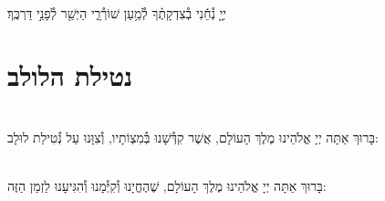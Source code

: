 \documentclass[twoside, openany, parskip=half, 11pt]{book}
\begin{document}
\vspace{-.5\baselineskip}

\\
 יְיָ֤ נְ֯חֵ֬נִי בְ֯צִדְקָתֶ֗ךָ לְ֯מַ֥עַן שׁוֹרְ֯רָ֑י הַיְשַׁ֖ר לְ֯פָנַ֣י דַּרְכֶּֽךָ׃

\vfill

\quad{}\quad{}






\section[נטילת הלולב]{ נטילת הלולב }
\label{lulav}
\\
בָּרוּךְ אַתָּה יְיָ אֱלֹהֵינוּ מֶלֶךְ הָעוֹלָם, אֲשֶׁר קִדְּ֯שָׁנוּ בְּ֯מִצְוֹתָיו, וְ֯צִוָּנוּ עַל נְ֯טִילַת לוּלָב:



\\
בָּרוּךְ אַתָּה יְיָ אֱלֹהֵינוּ מֶלֶךְ הָעוֹלָם, שֶׁהֶחֱיָנוּ וְ֯קִיְּ֯מָנוּ וְ֯הִגִּיעָנוּ לַזְמַן הַזֶּה:
\end{document}
